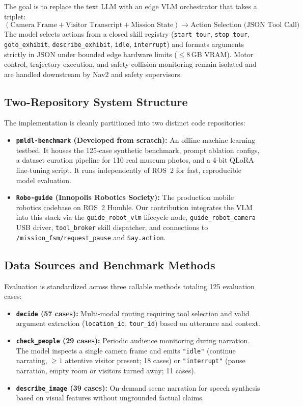 ﻿\documentclass[11pt,a4paper]{article}
\begin{document}
The goal is to replace the text LLM with an edge VLM orchestrator that takes a triplet:
\begin{equation}
    (\text{Camera Frame} + \text{Visitor Transcript} + \text{Mission State}) \longrightarrow \text{Action Selection (JSON Tool Call)}
\end{equation}
The model selects actions from a closed skill registry (\texttt{start\_tour}, \texttt{stop\_tour}, \texttt{goto\_exhibit}, \texttt{describe\_exhibit}, \texttt{idle}, \texttt{interrupt}) and formats arguments strictly in JSON under bounded edge hardware limits ($\le 8$\,GB VRAM). Motor control, trajectory execution, and safety collision monitoring remain isolated and are handled downstream by Nav2 and safety supervisors.

\subsection{Two-Repository System Structure}
The implementation is cleanly partitioned into two distinct code repositories:
\begin{itemize}
    \item \textbf{\texttt{pmldl-benchmark} (Developed from scratch):} An offline machine learning testbed. It houses the 125-case synthetic benchmark, prompt ablation configs, a dataset curation pipeline for 110 real museum photos, and a 4-bit QLoRA fine-tuning script. It runs independently of ROS~2 for fast, reproducible model evaluation.
    \item \textbf{\texttt{Robo-guide} (Innopolis Robotics Society):} The production mobile robotics codebase on ROS~2 Humble. Our contribution integrates the VLM into this stack via the \texttt{guide\_robot\_vlm} lifecycle node, \texttt{guide\_robot\_camera} USB driver, \texttt{tool\_broker} skill dispatcher, and connections to \texttt{/mission\_fsm/request\_pause} and \texttt{Say.action}.
\end{itemize}

\subsection{Data Sources and Benchmark Methods}
Evaluation is standardized across three callable methods totaling 125 evaluation cases:
\begin{itemize}
    \item \textbf{\texttt{decide} (57 cases):} Multi-modal routing requiring tool selection and valid argument extraction (\texttt{location\_id}, \texttt{tour\_id}) based on utterance and context.
    \item \textbf{\texttt{check\_people} (29 cases):} Periodic audience monitoring during narration. The model inspects a single camera frame and emits \texttt{"idle"} (continue narrating, $\ge 1$ attentive visitor present; 18 cases) or \texttt{"interrupt"} (pause narration, empty room or visitors turned away; 11 cases).
    \item \textbf{\texttt{describe\_image} (39 cases):} On-demand scene narration for speech synthesis based on visual features without ungrounded factual claims.
\end{itemize}
\end{document}
